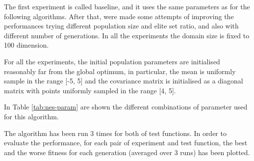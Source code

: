 The first experiment is called baseline, and it uses the same parameters as for the following algorithms. After that, were made some attempts of improving the performances trying different population size and elite set ratio, and also with different number of generations. In all the experiments the domain size is fixed to 100 dimension.

For all the experiments, the initial population parameters are initialised reasonably far from the global optimum, in particular, the mean is uniformly sample in the range [-5, 5] and the covariance matrix is initialised as a diagonal matrix with points uniformly sampled in the range [4, 5].

In Table \ref{tab:nes-param} are shown the different combinations of parameter used for this algorithm.
\bigskip

The algorithm has been run 3 times for both of test functions. 
In order to evaluate the performance, for each pair of experiment and test function, the best and the worse fitness for each generation (averaged over 3 runs) has been plotted. 
\bigskip

